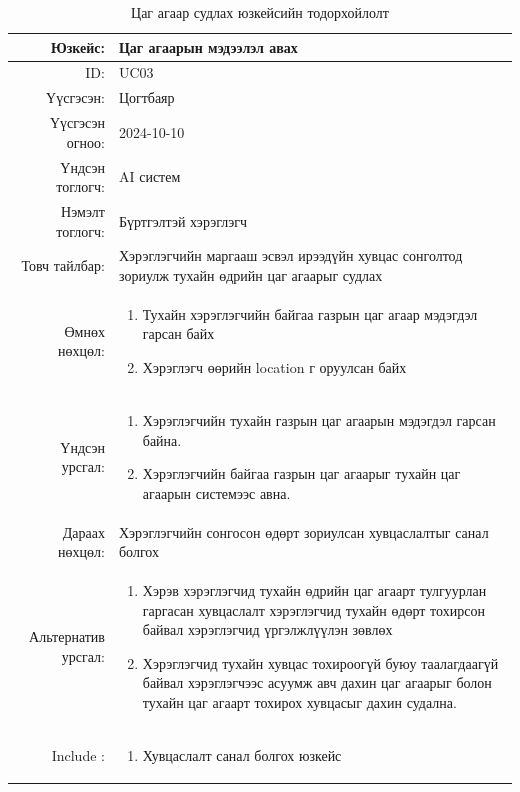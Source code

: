 \begin{longtable}{|r|p{11.5cm}|}
    \caption{Цаг агаар судлах юзкейсийн тодорхойлолт} 
    \label{table:songolt1}\\ \hline
    {Юзкейс:} & {Цаг агаарын мэдээлэл авах}\\ \hline
    {ID:} & {UC03}\\ \hline
    {Үүсгэсэн:} & {Цогтбаяр}\\ \hline
    {Үүсгэсэн огноо:} & {2024-10-10}\\ \hline
    {Үндсэн тоглогч:} & {AI систем}\\ \hline
    {Нэмэлт тоглогч:} & {Бүртгэлтэй хэрэглэгч}\\ \hline
    {Товч тайлбар:} & {Хэрэглэгчийн маргааш эсвэл ирээдүйн хувцас сонголтод зориулж тухайн өдрийн цаг агаарыг судлах}\\ \hline
    {Өмнөх нөхцөл:} & {\begin{enumerate}
        \item Тухайн хэрэглэгчийн байгаа газрын цаг агаар мэдэгдэл гарсан байх
        \item Хэрэглэгч өөрийн location г оруулсан байх 
    \end{enumerate}}\\ \hline
    {Үндсэн урсгал:} & {
    \begin{enumerate}
        \item Хэрэглэгчийн тухайн газрын цаг агаарын мэдэгдэл гарсан байна.
        \item Хэрэглэгчийн байгаа газрын цаг агаарыг тухайн цаг агаарын системээс авна.
       \end{enumerate}}\\ \hline
    {Дараах нөхцөл:} & {Хэрэглэгчийн сонгосон өдөрт зориулсан хувцаслалтыг санал болгох}\\ \hline
    {Альтернатив урсгал:} & {\begin{enumerate}
        \item Хэрэв хэрэглэгчид тухайн өдрийн цаг агаарт тулгуурлан гаргасан хувцаслалт хэрэглэгчид тухайн өдөрт тохирсон байвал хэрэглэгчид үргэлжлүүлэн зөвлөх  
        \item Хэрэглэгчид тухайн хувцас тохироогүй буюу таалагдаагүй байвал хэрэглэгчээс асуумж авч дахин цаг агаарыг болон тухайн цаг агаарт тохирох хувцасыг дахин судална.
        \end{enumerate}}\\ \hline
        {Include :} & {\begin{enumerate}
        \item Хувцаслалт санал болгох юзкейс
    \end{enumerate}}\\ \hline
\end{longtable}
